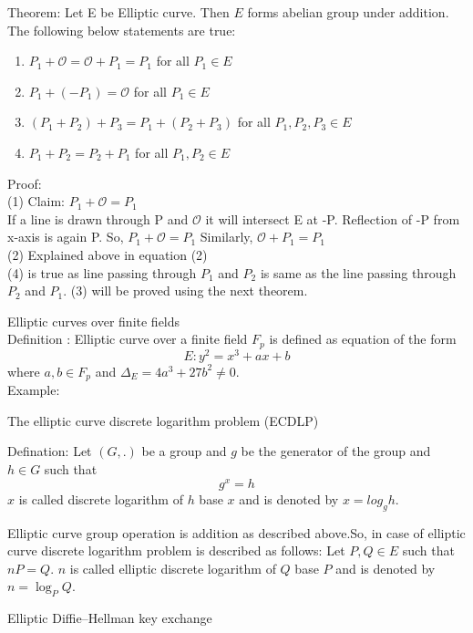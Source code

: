 \documentclass[12pt,a4paper]{report}
\begin{document}
Theorem: Let E be Elliptic curve. Then $E$ forms abelian group under addition. The following below statements are true:
 \begin{enumerate}
 \item $P_1+\mathscr{O}=\mathscr{O}+P_1=P_1$ for all $P_1 \in E$
 \item $P_1+(-P_1)=\mathscr{O}$ for all $P_1 \in E$
 \item $(P_1+P_2)+P_3=P_1+(P_2+P_3)$ for all $P_1,P_2,P_3 \in E$
 \item $P_1+P_2=P_2+P_1$ for all $P_1,P_2 \in E$
 \end{enumerate}
Proof:
\\(1) Claim: $P_1+\mathscr{O}=P_1$ \\
If a line is drawn through P and $\mathscr{O}$ it will intersect E at -P. Reflection of -P from x-axis is again P. So, $P_1+\mathscr{O}=P_1$ 
Similarly, $\mathscr{O}+P_1=P_1$\\
(2) Explained above in equation (2)\\
(4) is true as line passing through $P_1$ and $P_2$ is same as the line passing through $P_2$ and $P_1$. 
(3) will be proved using the next theorem.


\cleardoublepage
Elliptic curves over ﬁnite ﬁelds\\
Definition : Elliptic curve over a finite field $F_p$ is defined as equation of the form $$E:y^2 = x^3+ax+b$$ where $a,b\in F_p$ and $\Delta_E = 4a^3+27b^2\neq 0$. \\
Example:
\cleardoublepage


  The elliptic curve discrete logarithm
problem (ECDLP)

Defination: Let $(G,.)$ be a group and $g$ be the generator of the group and $h\in G$ such that $$g^x=h$$
$x$ is called discrete logarithm of $h$ base $x$ and is denoted by $x=log_g h$.

Elliptic curve group operation is addition as described above.So, in case of elliptic curve discrete logarithm problem is described as follows:
Let $P,Q \in E$ such that $nP=Q$. $n$ is called elliptic discrete logarithm of $Q$ base $P$ and is denoted by $n =\log_P Q$.

\cleardoublepage
  Elliptic Diﬃe–Hellman key exchange



\end{document}

